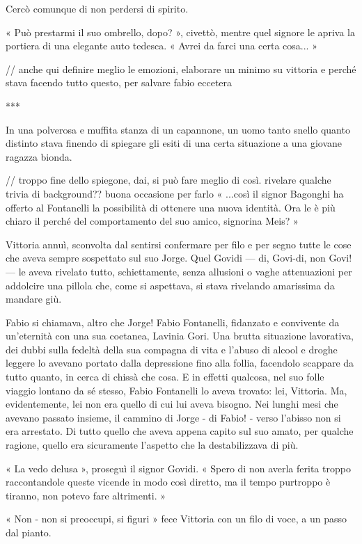 Cercò comunque di non perdersi di spirito.

« Può prestarmi il suo ombrello, dopo? », civettò, mentre quel signore le apriva la portiera di una elegante auto tedesca. « Avrei da farci una certa cosa... »

// anche qui definire meglio le emozioni, elaborare un minimo su vittoria e perché stava facendo tutto questo, per salvare fabio eccetera

***

In una polverosa e muffita stanza di un capannone, un uomo tanto snello quanto distinto stava finendo di spiegare gli esiti di una certa situazione a una giovane ragazza bionda.

// troppo fine dello spiegone, dai, si può fare meglio di così. rivelare qualche trivia di background?? buona occasione per farlo
« ...così il signor Bagonghi ha offerto al Fontanelli la possibilità di ottenere una nuova identità. Ora le è più chiaro il perché del comportamento del suo amico, signorina Meis? »

Vittoria annuì, sconvolta dal sentirsi confermare per filo e per segno tutte le cose che aveva sempre sospettato sul suo Jorge. Quel Govidi --- di, Govi-di, non Govi! --- le aveva rivelato tutto, schiettamente, senza allusioni o vaghe attenuazioni per addolcire una pillola che, come si aspettava, si stava rivelando amarissima da mandare giù.

Fabio si chiamava, altro che Jorge! Fabio Fontanelli, fidanzato e convivente da un'eternità con una sua coetanea, Lavinia Gori. Una brutta situazione lavorativa, dei dubbi sulla fedeltà della sua compagna di vita e l'abuso di alcool e droghe leggere lo avevano portato dalla depressione fino alla follia, facendolo scappare da tutto quanto, in cerca di chissà che cosa. E in effetti qualcosa, nel suo folle viaggio lontano da sé stesso, Fabio Fontanelli lo aveva trovato: lei, Vittoria. Ma, evidentemente, lei non era quello di cui lui aveva bisogno. Nei lunghi mesi che avevano passato insieme, il cammino di Jorge - di Fabio! - verso l'abisso non si era arrestato. Di tutto quello che aveva appena capito sul suo amato, per qualche ragione, quello era sicuramente l'aspetto che la destabilizzava di più.

« La vedo delusa », proseguì il signor Govidi. « Spero di non averla ferita troppo raccontandole queste vicende in modo così diretto, ma il tempo purtroppo è tiranno, non potevo fare altrimenti. »

« Non - non si preoccupi, si figuri » fece Vittoria con un filo di voce, a un passo dal pianto.

